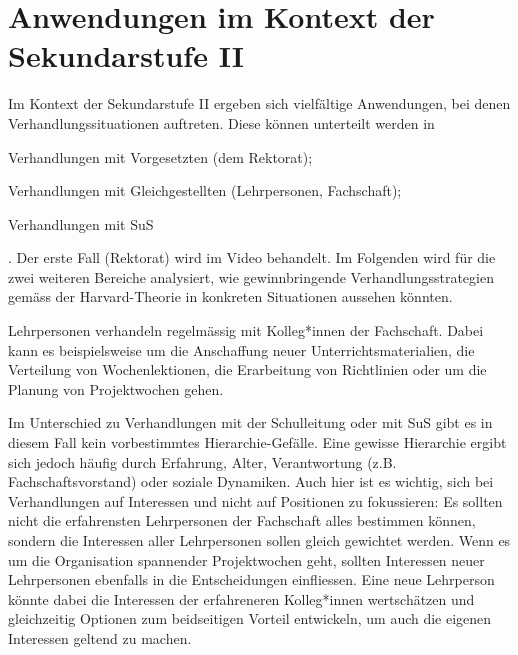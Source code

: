  \section*{Anwendungen im Kontext der Sekundarstufe II}
Im Kontext der Sekundarstufe II ergeben sich vielfältige Anwendungen, bei denen Verhandlungssituationen auftreten. Diese können unterteilt werden in \begin{enumerate*}
\item Verhandlungen mit Vorgesetzten (dem Rektorat);\item Verhandlungen mit Gleichgestellten (Lehrpersonen, Fachschaft);\item Verhandlungen mit SuS
\end{enumerate*}. Der erste Fall (Rektorat) wird im Video behandelt. Im Folgenden wird für die zwei weiteren Bereiche analysiert, wie gewinnbringende Verhandlungsstrategien gemäss der Harvard-Theorie in konkreten Situationen aussehen könnten.

\begin{myExBox}[title={Anwendung 1: Verhandlung mit Gleichgestellten (Fachschaft, Lehrpersonen)}]
Lehrpersonen verhandeln regelmässig mit Kolleg*innen der Fachschaft. Dabei kann es beispielsweise um die Anschaffung neuer Unterrichtsmaterialien, die Verteilung von Wochenlektionen, die Erarbeitung von Richtlinien oder um die Planung von Projektwochen gehen.

Im Unterschied zu Verhandlungen mit der Schulleitung oder mit SuS gibt es in diesem Fall kein vorbestimmtes Hierarchie-Gefälle. Eine gewisse Hierarchie ergibt sich jedoch häufig durch Erfahrung, Alter, Verantwortung (z.B. Fachschaftsvorstand) oder soziale Dynamiken. Auch hier ist es wichtig, sich bei Verhandlungen auf Interessen und nicht auf Positionen zu fokussieren: Es sollten nicht die erfahrensten Lehrpersonen der Fachschaft alles bestimmen können, sondern die Interessen aller Lehrpersonen sollen gleich gewichtet werden. Wenn es um die Organisation spannender Projektwochen geht, sollten Interessen neuer Lehrpersonen ebenfalls in die Entscheidungen einfliessen. Eine neue Lehrperson könnte dabei die Interessen der erfahreneren Kolleg*innen wertschätzen und gleichzeitig Optionen zum beidseitigen Vorteil entwickeln, um auch die eigenen Interessen geltend zu machen.  

\end{myExBox}

